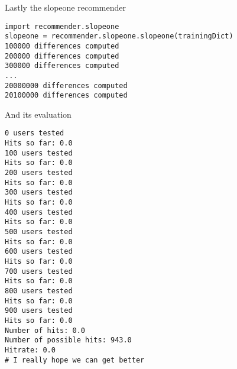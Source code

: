 Lastly the slopeone recommender
\begin{lstlisting}
import recommender.slopeone
slopeone = recommender.slopeone.slopeone(trainingDict)
100000 differences computed
200000 differences computed
300000 differences computed
...
20000000 differences computed
20100000 differences computed
\end{lstlisting}

And its evaluation
\begin{lstlisting}
0 users tested
Hits so far: 0.0
100 users tested
Hits so far: 0.0
200 users tested
Hits so far: 0.0
300 users tested
Hits so far: 0.0
400 users tested
Hits so far: 0.0
500 users tested
Hits so far: 0.0
600 users tested
Hits so far: 0.0
700 users tested
Hits so far: 0.0
800 users tested
Hits so far: 0.0
900 users tested
Hits so far: 0.0
Number of hits: 0.0
Number of possible hits: 943.0
Hitrate: 0.0
# I really hope we can get better 
\end{lstlisting}
